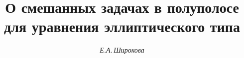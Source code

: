 




% 


\newcommand{\myD}{\overset{\scriptscriptstyle\backprime}{D}{}}


\newcommand{\im}{\operatorname{Im}}


\newcommand{\sh}{\operatorname{sh}}


\newcommand{\re}{\operatorname{Re}}


\newcommand{\tg}{\operatorname{tg}}


\newcommand{\ctg}{\operatorname{ctg}}


\newcommand{\vrai}{\operatorname{vrai}}


\newcommand{\tts}[1]{}


\renewcommand{\baselinestretch}{0.97}







\setcounter{page}{77}















\author{\it Е.А.\,Широкова}




\title{О смешанных задачах в полуполосе\\


для уравнения эллиптического типа}





\date{}




\pagestyle{plain} %





